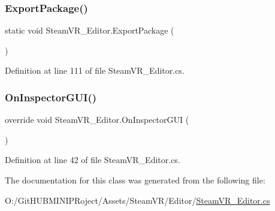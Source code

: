 \subsubsection{\texorpdfstring{ExportPackage()}{ExportPackage()}}
{\footnotesize\ttfamily static void Steam\+V\+R\+\_\+\+Editor.\+Export\+Package (\begin{DoxyParamCaption}{ }\end{DoxyParamCaption})\hspace{0.3cm}{\ttfamily [static]}}



Definition at line 111 of file Steam\+V\+R\+\_\+\+Editor.\+cs.

\mbox{\label{class_steam_v_r___editor_a3653a66adfbb43e4d72cb43368244be7}} 
\subsubsection{\texorpdfstring{OnInspectorGUI()}{OnInspectorGUI()}}
{\footnotesize\ttfamily override void Steam\+V\+R\+\_\+\+Editor.\+On\+Inspector\+G\+UI (\begin{DoxyParamCaption}{ }\end{DoxyParamCaption})}



Definition at line 42 of file Steam\+V\+R\+\_\+\+Editor.\+cs.



The documentation for this class was generated from the following file\+:\begin{DoxyCompactItemize}
\item 
O\+:/\+Git\+H\+U\+B\+M\+I\+N\+I\+P\+Roject/\+Assets/\+Steam\+V\+R/\+Editor/\mbox{\hyperlink{_steam_v_r___editor_8cs}{Steam\+V\+R\+\_\+\+Editor.\+cs}}\end{DoxyCompactItemize}
